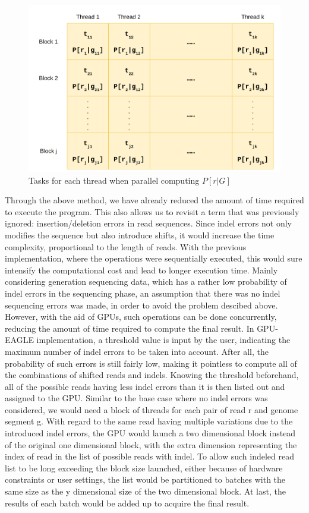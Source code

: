 \documentclass{PHlab-thesis}
\begin{document}
\begin{figure}
	\centering
	\includegraphics[scale=0.3]{figures/threadview.png}
	\caption{Tasks for each thread when parallel computing $P[r|G]$}
	\label{fig:tv} %
\end{figure}

Through the above method, we have already reduced the amount of time required to execute the program. This also allows us to revisit a term that was previously ignored: insertion/deletion errors in read sequences. Since indel errors not only modifies the sequence but also introduce shifts, it would increase the time complexity, proportional to the length of reads. With the previous implementation, where the operations were sequentially executed, this would sure intensify the computational cost and lead to longer execution time. Mainly considering generation sequencing data, which has a rather low probability of indel errors in the sequencing phase, an assumption that there was no indel sequencing errors was made, in order to avoid the problem descibed above. However, with the aid of GPUs, such operations can be done concurrently, reducing the amount of time required to compute the final result. In GPU-EAGLE implementation, a threshold value is input by the user, indicating the maximum number of indel errors to be taken into account. After all, the probability of such errors is still fairly low, making it pointless to compute all of the combinations of shifted reads and indels. Knowing the threshold beforehand, all of the possible reads having less indel errors than it is then listed out and assigned to the GPU. Similar to the base case where no indel errors was considered, we would need a block of threads for each pair of read r and genome segment g. With regard to the same read having multiple variations due to the introduced indel errors, the GPU would launch a two dimensional block instead of the original one dimensional block, with the extra dimension representing the index of read in the list of possible reads with indel. To allow such indeled read list to be long exceeding the block size launched, either because of hardware constraints or user settings, the list would be partitioned to batches with the same size as the y dimensional size of the two dimensional block. At last, the results of each batch would be added up to acquire the final result.
\end{document}
